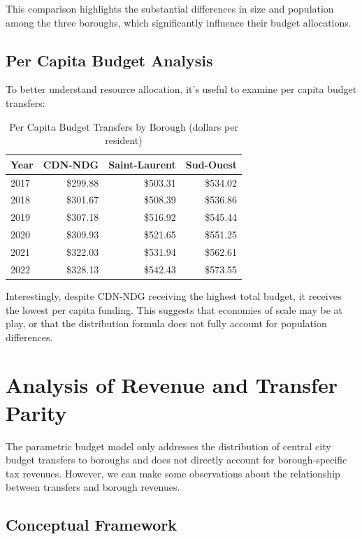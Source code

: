 \documentclass{article}
\begin{document}
This comparison highlights the substantial differences in size and population among the three boroughs, which significantly influence their budget allocations.

\subsection{Per Capita Budget Analysis}

To better understand resource allocation, it's useful to examine per capita budget transfers:

\begin{table}[H]
\centering
\begin{tabular}{lrrr}
\toprule
Year & CDN-NDG & Saint-Laurent & Sud-Ouest \\
\midrule
2017 & \$299.88 & \$503.31 & \$534.02 \\
2018 & \$301.67 & \$508.39 & \$536.86 \\
2019 & \$307.18 & \$516.92 & \$545.44 \\
2020 & \$309.93 & \$521.65 & \$551.25 \\
2021 & \$322.03 & \$531.94 & \$562.61 \\
2022 & \$328.13 & \$542.43 & \$573.55 \\
\bottomrule
\end{tabular}
\caption{Per Capita Budget Transfers by Borough (dollars per resident)}
\end{table}

Interestingly, despite CDN-NDG receiving the highest total budget, it receives the lowest per capita funding. This suggests that economies of scale may be at play, or that the distribution formula does not fully account for population differences.

\section{Analysis of Revenue and Transfer Parity}

The parametric budget model only addresses the distribution of central city budget transfers to boroughs and does not directly account for borough-specific tax revenues. However, we can make some observations about the relationship between transfers and borough revenues.

\subsection{Conceptual Framework}
\end{document}
